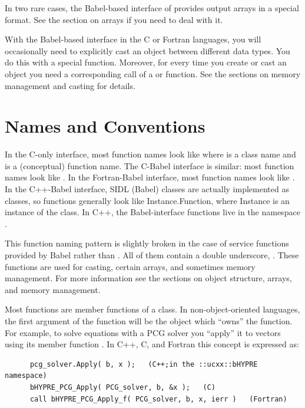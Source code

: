 In two rare cases, the Babel-based interface of \hypre{} provides
output arrays in a special format.  See the section on arrays if you
need to deal with it.

With the Babel-based interface in the C or Fortran languages, you will
occasionally need to explicitly cast an object between different data
types.  You do this with a special  function.  Moreover,
for every time you create or cast an object you need a corresponding
call of a  or  function. See the
sections on memory management and casting for details.


\section{Names and Conventions}

In the C-only interface, most \hypre{} function names look like
 where  is a class name and
 is a (conceptual) function name.  The C-Babel
interface is similar: most function names look like
.  In the Fortran-Babel interface, most
function names look like .  In the
C++-Babel interface, SIDL (Babel) classes are actually implemented as
classes, so functions generally look like Instance.Function, where
Instance is an instance of the class.  In C++, the
Babel-interface functions live in the namespace .

This function naming pattern is slightly broken in the case of service
functions provided by Babel rather than \hypre{}.  All of them contain
a double underscore, \code{__}.  These functions are used for casting,
certain arrays, and sometimes memory management.  For more information
see the sections on object structure, arrays, and memory management.

Most functions are member functions of a class.  In
non-object-oriented languages, the first argument of the function will
be the object which ``owns'' the function.  For example, to solve
equations with a PCG solver you ``apply'' it to vectors using its
member function .  In C++, C, and Fortran this concept is
expressed as:
\begin{verbatim}
      pcg_solver.Apply( b, x );   (C++;in the ::ucxx::bHYPRE namespace)
      bHYPRE_PCG_Apply( PCG_solver, b, &x );   (C)
      call bHYPRE_PCG_Apply_f( PCG_solver, b, x, ierr )   (Fortran)
\end{verbatim}

